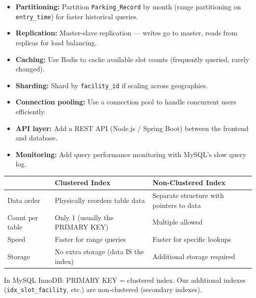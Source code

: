 \documentclass[12pt,a4paper]{article}
\begin{document}
\begin{questionbox}
\end{questionbox}
\begin{answerbox}
\begin{itemize}[nosep]
    \item \textbf{Partitioning:} Partition \texttt{Parking\_Record} by month (range partitioning on \texttt{entry\_time}) for faster historical queries.
    \item \textbf{Replication:} Master-slave replication --- writes go to master, reads from replicas for load balancing.
    \item \textbf{Caching:} Use Redis to cache available slot counts (frequently queried, rarely changed).
    \item \textbf{Sharding:} Shard by \texttt{facility\_id} if scaling across geographies.
    \item \textbf{Connection pooling:} Use a connection pool to handle concurrent users efficiently.
    \item \textbf{API layer:} Add a REST API (Node.js / Spring Boot) between the frontend and database.
    \item \textbf{Monitoring:} Add query performance monitoring with MySQL's slow query log.
\end{itemize}
\end{answerbox}

\begin{questionbox}
\end{questionbox}
\begin{answerbox}
\begin{longtable}{@{}lp{5.5cm}p{5.5cm}@{}}
\toprule
& \textbf{Clustered Index} & \textbf{Non-Clustered Index} \\
\midrule
Data order & Physically reorders table data & Separate structure with pointers to data \\
Count per table & Only 1 (usually the PRIMARY KEY) & Multiple allowed \\
Speed & Faster for range queries & Faster for specific lookups \\
Storage & No extra storage (data IS the index) & Additional storage required \\
\bottomrule
\end{longtable}

In MySQL InnoDB: PRIMARY KEY = clustered index. Our additional indexes (\texttt{idx\_slot\_facility}, etc.) are non-clustered (secondary indexes).
\end{answerbox}
\end{document}

